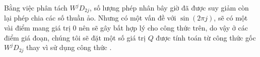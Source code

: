 				Bằng việc phân tách $W^j D_{2j}$, số lượng phép nhân bây giờ đã được suy giảm còn lại phép chia các số thuần ảo. Nhưng có một vấn đề với $\sin(2\pi j)$, sẽ có một vài điểm mang giá trị $0$ nên sẽ gây bất hợp lý cho công thức trên, do vậy ở các điểm giá đoạn, chúng tôi sẽ đặt một số giá trị $Q$ được tính toán từ công thức gốc $W^j D_{2j}$ thay vì sử dụng công thức .
				
				
